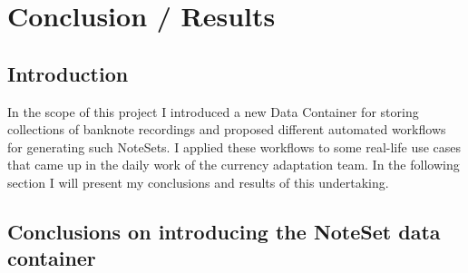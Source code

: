 \chapter{Conclusion / Results}
\label{chap:conclusions}

\section{Introduction}
In the scope of this project I introduced a new Data Container for storing collections of banknote recordings and proposed different automated workflows for generating such NoteSets. I applied these workflows to some real-life use cases that came up in the daily work of the currency adaptation team. In the following section I will present my conclusions and results of this undertaking.

\section{Conclusions on introducing the NoteSet data container}

